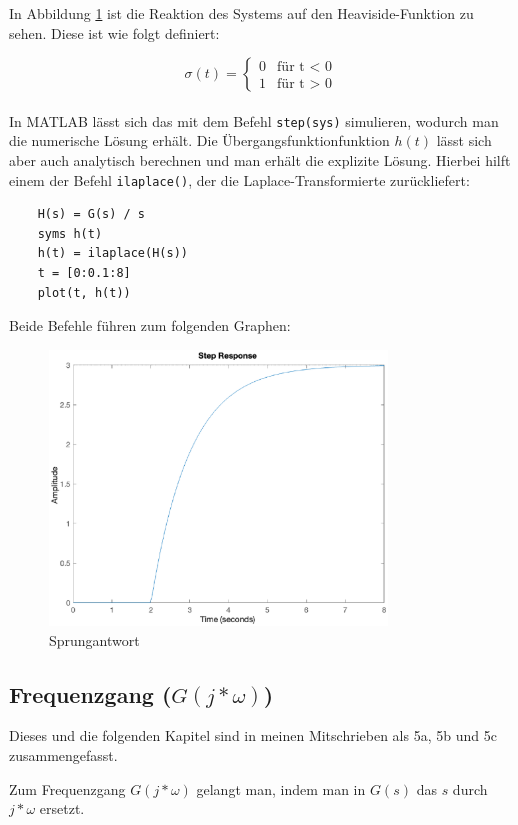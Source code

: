 In Abbildung \ref{fig:sprung} ist die Reaktion des Systems auf den Heaviside-Funktion zu sehen. Diese ist wie folgt definiert:

\[
\sigma (t) = \begin{cases} 0 & \text{für t < 0} \\ 1 & \text{für t > 0} \end{cases}  
\]
\\
In MATLAB lässt sich das mit dem Befehl \texttt{step(sys)} simulieren, wodurch man die numerische Lösung erhält. Die Übergangsfunktionfunktion $h(t)$ lässt sich aber auch analytisch berechnen und man erhält die explizite Lösung. Hierbei hilft einem der Befehl \texttt{ilaplace()}, der die Laplace-Transformierte zurückliefert:

\begin{lstlisting}
    H(s) = G(s) / s
    syms h(t)
    h(t) = ilaplace(H(s))
    t = [0:0.1:8]
    plot(t, h(t))
\end{lstlisting} 

Beide Befehle führen zum folgenden Graphen:

\begin{figure}[H]
    \label{fig:sprung}
    \centering
    \includegraphics[width=0.8\textwidth]{Bilder/SprungantwortPT1Tt.eps}
    \caption{Sprungantwort}
 \end{figure}


\subsection{Frequenzgang ($G(j * \omega)$)}
Dieses und die folgenden Kapitel sind in meinen Mitschrieben als 5a, 5b und 5c zusammengefasst.

Zum Frequenzgang $G(j * \omega)$ gelangt man, indem man in $G(s)$ das $s$ durch $j * \omega$ ersetzt.

